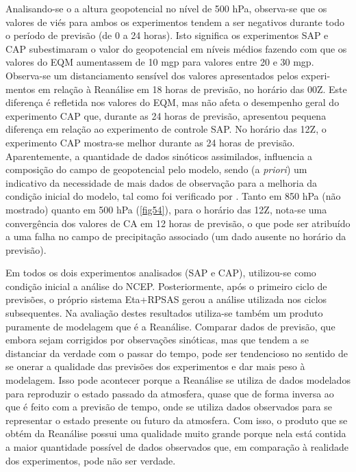 Analisando-se o a altura geopotencial no nível de 500 hPa, observa-se que os valores de viés para ambos os experimentos tendem a ser negativos durante todo o período de previsão (de 0 a 24 horas). Isto significa os experimentos SAP e CAP subestimaram o valor do geopotencial em níveis médios fazendo com que os valores do EQM aumentassem de 10 mgp para valores entre 20 e 30 mgp. Observa-se um distanciamento sensível dos valores apresentados pelos experi-mentos em relação à Reanálise em 18 horas de previsão, no horário das 00Z. Este diferença é refletida nos valores do EQM, mas não afeta o desempenho geral do experimento CAP que, durante as 24 horas de previsão, apresentou pequena diferença em relação ao experimento de controle SAP. No horário das 12Z, o experimento CAP mostra-se melhor durante as 24 horas de previsão. Aparentemente, a quantidade de dados sinóticos assimilados, influencia a composição do campo de geopotencial pelo modelo, sendo (a \textit{priori}) um indicativo da necessidade de mais dados de observação para a melhoria da condição inicial do modelo, tal como foi verificado por . Tanto em 850 hPa (não mostrado) quanto em 500 hPa (\autoref{fig54}), para o horário das 12Z, nota-se uma convergência dos valores de CA em 12 horas de previsão, o que pode ser atribuído a uma falha no campo de precipitação associado (um dado ausente no horário da previsão).

Em todos os dois experimentos analisados (SAP e CAP), utilizou-se como condição inicial a análise do NCEP. Posteriormente, após o primeiro ciclo de previsões, o próprio sistema Eta+RPSAS gerou a análise utilizada nos ciclos subsequentes. Na avaliação destes resultados utiliza-se também um produto puramente de modelagem que é a Reanálise. Comparar dados de previsão, que embora sejam corrigidos por observações sinóticas, mas que tendem a se distanciar da verdade com o passar do tempo, pode ser tendencioso no sentido de se onerar a qualidade das previsões dos experimentos e dar mais peso à modelagem. Isso pode acontecer porque a Reanálise se utiliza de dados modelados para reproduzir o estado passado da atmosfera, quase que de forma inversa ao que é feito com a previsão de tempo, onde se utiliza dados observados para se representar o estado presente ou futuro da atmosfera. Com isso, o produto que se obtém da Reanálise possui uma qualidade muito grande porque nela está contida a maior quantidade possível de dados observados que, em comparação à realidade dos experimentos, pode não ser verdade.

